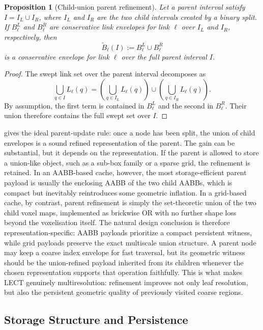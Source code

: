 \documentclass[journal]{IEEEtran}
\newtheorem{proposition}{Proposition}
\begin{document}
\begin{proposition}[Child-union parent refinement]
\label{prop:parent_union}
Let a parent interval satisfy $I = I_L \cup I_R$, where $I_L$ and $I_R$ are the
two child intervals created by a binary split. If $B_\ell^L$ and $B_\ell^R$ are
conservative link envelopes for link $\ell$ over $I_L$ and $I_R$, respectively,
then
\[
\widetilde{B}_\ell(I) := B_\ell^L \cup B_\ell^R
\]
is a conservative envelope for link $\ell$ over the full parent interval $I$.
\end{proposition}

\begin{proof}
The swept link set over the parent interval decomposes as
\[
\bigcup_{q\in I} L_\ell(q)
= \left(\bigcup_{q\in I_L} L_\ell(q)\right)
\cup
\left(\bigcup_{q\in I_R} L_\ell(q)\right).
\]
By assumption, the first term is contained in $B_\ell^L$ and the second in
$B_\ell^R$. Their union therefore contains the full swept set over $I$.
\end{proof}

 gives the ideal parent-update rule: once a node has
been split, the union of child envelopes is a sound refined representation of
the parent. The gain can be substantial, but it depends on the representation.
If the parent is allowed to store a union-like object, such as a sub-box family
or a sparse grid, the refinement is retained. In an AABB-based cache, however,
the most storage-efficient parent payload is usually the enclosing AABB of the
two child AABBs, which is compact but inevitably reintroduces some geometric
inflation. In a grid-based cache, by contrast, parent refinement is simply the
set-theoretic union of the two child voxel maps, implemented as brickwise OR
with no further shape loss beyond the voxelisation itself. The natural design
conclusion is therefore representation-specific: AABB payloads prioritize a
compact persistent witness, while grid payloads preserve the exact multiscale
union structure. A parent node may keep a coarse index envelope for fast
traversal, but its geometric witness should be the union-refined
payload inherited from its children whenever the chosen representation supports
that operation faithfully. This is what makes LECT genuinely multiresolution:
refinement improves not only leaf resolution, but also the persistent geometric
quality of previously visited coarse regions.

\subsection{Storage Structure and Persistence}\label{sec:lect_storage}
\end{document}
